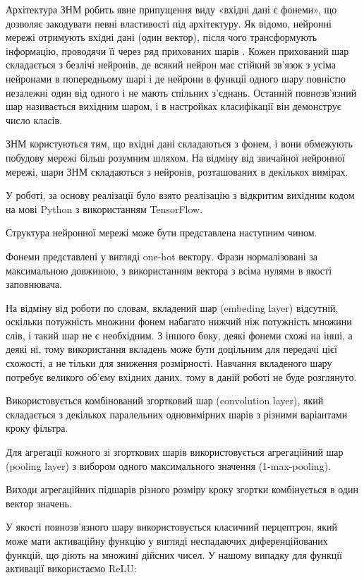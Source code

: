 Архітектура ЗНМ робить явне припущення виду «вхідні дані є фонеми», що дозволяє закодувати певні властивості під архітектуру. Як відомо, нейронні мережі отримують вхідні дані (один вектор), після чого трансформують інформацію, проводячи її через ряд прихованих шарів \cite{Kim_2014,Zhang_2015}. Кожен прихований шар складається з безлічі нейронів, де всякий нейрон має стійкий зв’язок з усіма нейронами в попередньому шарі і де нейрони в функції одного шару повністю незалежні один від одного і не мають спільних з’єднань. Останній повнозв’язний шар називається вихідним шаром, і в настройках класифікації він демонструє число класів.

ЗНМ користуються тим, що вхідні дані складаються з фонем, і вони обмежують побудову мережі більш розумним шляхом. На відміну від звичайної нейронної мережі, шари ЗНМ складаються з нейронів, розташованих в декількох вимірах.

У роботі, за основу реалізації було взято реалізацію з відкритим вихідним кодом \cite{Britz_2015} на мові Python з використанням TensorFlow.

Структура нейронної мережі може бути представлена наступним чином.

Фонеми представлені у вигляді one-hot вектору. Фрази нормалізовані за максимальною довжиною, з використанням вектора з всіма нулями в якості заповнювача.

На відміну від роботи по словам, вкладений шар (embeding layer) відсутній, оскільки потужність множини фонем набагато нижчий ніж потужність множини слів, і такий шар не є необхідним. З іншого боку, деякі фонеми схожі на інші, а деякі ні, тому використання вкладень може бути доцільним для передачі цієї схожості, а не тільки для зниження розмірності. Навчання вкладеного шару потребує великого об’єму вхідних даних, тому в даній роботі не буде розглянуто.

Використовується комбінований згортковий шар (convolution layer), який складається з декількох паралельних одновимірних шарів з різними варіантами кроку фільтра.

Для агрегації кожного зі згорткових шарів використовується агрегаційний шар (pooling layer) з вибором одного максимального значення (1-max-pooling).

Виходи агрегаційних підшарів різного розміру кроку згортки комбінується в один вектор значень.

У якості повнозв’язного шару використовується класичний перцептрон, який може мати активаційну функцію у вигляді неспадаючих диференційованих функцій, що діють на множині дійсних чисел. У нашому випадку для функції активації використаємо ReLU:

